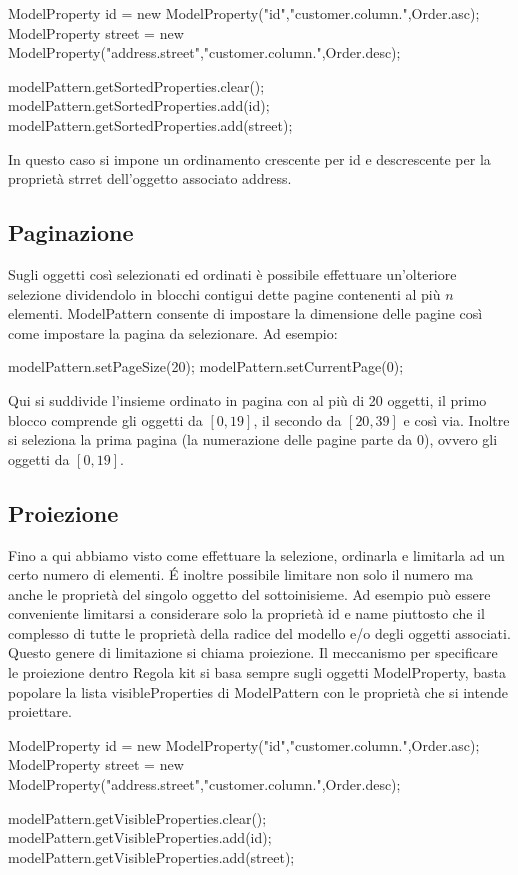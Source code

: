 \begin{java}
   ModelProperty id =  new ModelProperty("id","customer.column.",Order.asc);
   ModelProperty street =  new ModelProperty("address.street","customer.column.",Order.desc);

   modelPattern.getSortedProperties.clear();
   modelPattern.getSortedProperties.add(id);
   modelPattern.getSortedProperties.add(street);
\end{java}

In questo caso si impone un ordinamento crescente per id e descrescente per la proprietà strret dell'oggetto associato address.


\subsection{Paginazione}
Sugli oggetti così selezionati ed ordinati è possibile effettuare un'olteriore selezione dividendolo in blocchi contigui dette pagine contenenti al più $n$ elementi. ModelPattern consente di impostare la dimensione delle pagine così come impostare la pagina da selezionare. Ad esempio:

\begin{java}
  modelPattern.setPageSize(20);
  modelPattern.setCurrentPage(0);
\end{java}

Qui si suddivide l'insieme ordinato in pagina con al più di 20 oggetti, il primo blocco comprende gli oggetti da $[0,19]$, il secondo da $[20,39]$ e così via. Inoltre si seleziona la prima pagina (la numerazione delle pagine parte da 0), ovvero gli oggetti da $[0,19]$.

\subsection{Proiezione}
Fino a qui abbiamo visto come effettuare la selezione, ordinarla e limitarla ad un certo numero di elementi. \'{E} inoltre possibile limitare non solo il numero ma anche le proprietà del singolo oggetto del sottoinisieme. Ad esempio può essere conveniente limitarsi a considerare solo la proprietà id e name piuttosto che il complesso di tutte le proprietà della radice del modello e/o degli oggetti associati. Questo genere di limitazione si chiama proiezione.
Il meccanismo per specificare le proiezione dentro Regola kit si basa sempre sugli oggetti ModelProperty, basta popolare la lista visibleProperties di ModelPattern con le proprietà che si intende proiettare.


\begin{java}
   ModelProperty id =  new ModelProperty("id","customer.column.",Order.asc);
   ModelProperty street =  new ModelProperty("address.street","customer.column.",Order.desc);

   modelPattern.getVisibleProperties.clear();
   modelPattern.getVisibleProperties.add(id);
   modelPattern.getVisibleProperties.add(street);
\end{java}

